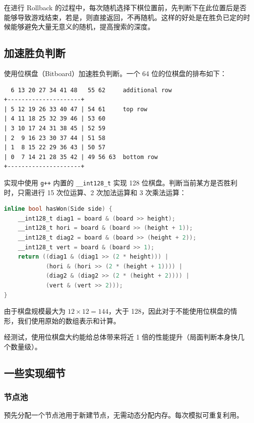 \documentclass[a4paper]{article}
\begin{document}
在进行 Rollback 的过程中，每次随机选择下棋位置前，先判断下在此位置后是否能够导致游戏结束，若是，则直接返回，不再随机。这样的好处是在胜负已定的时候能够避免大量无意义的随机，提高搜索的深度。

\subsection{加速胜负判断}

使用位棋盘（Bitboard）加速胜负判断。一个 64 位的位棋盘的排布如下：

\begin{lstlisting}
  6 13 20 27 34 41 48   55 62     additional row
+---------------------+ 
| 5 12 19 26 33 40 47 | 54 61     top row
| 4 11 18 25 32 39 46 | 53 60
| 3 10 17 24 31 38 45 | 52 59
| 2  9 16 23 30 37 44 | 51 58
| 1  8 15 22 29 36 43 | 50 57
| 0  7 14 21 28 35 42 | 49 56 63  bottom row
+---------------------+    
\end{lstlisting}

实现中使用 \texttt{g++} 内置的 \texttt{\_\_int128\_t} 实现 128 位棋盘。判断当前某方是否胜利时，只需进行 15 次位运算、2 次加法运算和 3 次乘法运算：

\begin{lstlisting}[language=C++]
inline bool hasWon(Side side) {
    __int128_t diag1 = board & (board >> height);
    __int128_t hori = board & (board >> (height + 1));
    __int128_t diag2 = board & (board >> (height + 2));
    __int128_t vert = board & (board >> 1);
    return ((diag1 & (diag1 >> (2 * height))) |
            (hori & (hori >> (2 * (height + 1)))) |
            (diag2 & (diag2 >> (2 * (height + 2)))) |
            (vert & (vert >> 2)));
}
\end{lstlisting}

由于棋盘规模最大为 $12\times 12=144$，大于 128，因此对于不能使用位棋盘的情形，我们使用原始的数组表示和计算。

经测试，使用位棋盘大约能给总体带来将近 1 倍的性能提升（局面判断本身快几个数量级）。

\subsection{一些实现细节}

\subsubsection{节点池}

预先分配一个节点池用于新建节点，无需动态分配内存。每次模拟可重复利用。
\end{document}
